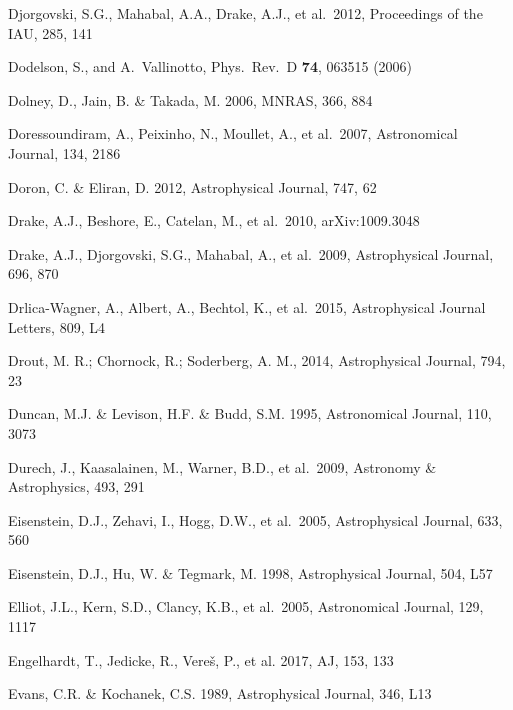 \documentclass[twocolumn]{aastex61}
\begin{document}
\begin{thebibliography}{}
 Djorgovski, S.G., Mahabal, A.A., Drake, A.J., et al.~2012, Proceedings of the IAU, 285, 141

 Dodelson, S., and A.~Vallinotto, Phys.\ Rev.\ D {\bf 74}, 063515 (2006)

 Dolney, D., Jain, B. \& Takada, M. 2006, MNRAS, 366, 884

 Doressoundiram, A., Peixinho, N., Moullet, A., et al.~2007, Astronomical Journal, 134, 2186

 Doron, C. \& Eliran, D. 2012, Astrophysical Journal, 747, 62

 Drake, A.J., Beshore, E., Catelan, M., et al.~2010, arXiv:1009.3048

 Drake, A.J., Djorgovski, S.G., Mahabal, A., et al.~2009, Astrophysical Journal, 696, 870

 Drlica-Wagner, A., Albert, A., Bechtol, K., et al.\ 2015, Astrophysical Journal Letters, 809, L4

 Drout, M. R.; Chornock, R.; Soderberg, A. M., 2014, Astrophysical Journal,  794, 23

 Duncan, M.J. \& Levison, H.F. \& Budd, S.M. 1995, Astronomical Journal, 110, 3073

 Durech, J., Kaasalainen, M., Warner, B.D., et al.~2009, Astronomy \& Astrophysics, 493, 291

 Eisenstein, D.J., Zehavi, I., Hogg, D.W., et al.~2005, Astrophysical Journal, 633, 560

 Eisenstein, D.J., Hu, W. \& Tegmark, M. 1998, Astrophysical Journal, 504, L57

 Elliot, J.L., Kern, S.D., Clancy, K.B., et al.~2005,  Astronomical Journal, 129, 1117

 Engelhardt, T., Jedicke, R., Vere\v{s}, P., et al. 2017, AJ, 153, 133

 Evans, C.R. \& Kochanek, C.S. 1989, Astrophysical Journal, 346, L13


\end{thebibliography}
\end{document}
